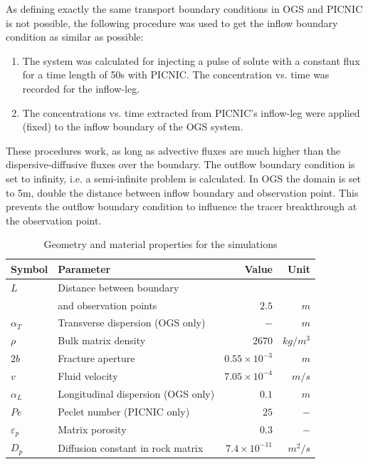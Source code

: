 As defining exactly the same transport boundary conditions in OGS
and PICNIC is not possible, the following procedure was used to get
the inflow boundary condition as similar as possible:

\begin{enumerate}
	\item 
The system was calculated for injecting a pulse of solute with a
constant flux for a time length of 50s with PICNIC. The
concentration vs. time was recorded for the inflow-leg.
  \item
The concentrations vs. time extracted from PICNIC's inflow-leg
were applied (fixed) to the inflow boundary of the OGS system.
\end{enumerate}

These procedures work, as long as advective fluxes are much higher
than the dispersive-diffusive fluxes over the boundary.
%
The outflow boundary condition is set to infinity, i.e. a
semi-infinite problem is calculated. In OGS the domain is set to
5m, double the distance between inflow boundary and observation
point. This prevents the outflow boundary condition to influence the
tracer breakthrough at the observation point.

\begin{table}[htb]%
\begin{center}
\begin{tabular}{llrr}
\toprule
Symbol & Parameter & Value & Unit \\
\midrule
 $L$ & Distance between boundary & & \\
     & and observation points & $2.5$ & $m$ \\
 $\alpha_{T}$ & Transverse dispersion (OGS only) & $-$ & $m$ \\
 $\rho$ & Bulk matrix density & $2670$ & $kg/m^{3}$ \\
 $2b$ & Fracture aperture & $0.55\times10^{-3}$ & $m$ \\
 $v$ & Fluid velocity & $7.05\times10^{-4}$ & $m/s$ \\
 $\alpha_{L}$ & Longitudinal dispersion (OGS only) & $0.1$ & $m$ \\
 $Pe$ & Peclet number (PICNIC only) & $25$ & $-$ \\
 $\varepsilon_{p}$ & Matrix porosity & $0.3$ & $-$ \\
 $D_{p}$ & Diffusion constant in rock matrix & $7.4\times10^{-11}$ & $m^{2}/s$ \\
\bottomrule
\end{tabular}
\caption{Geometry and material properties for the simulations} %
\label{tab:c_matdiff_setting}
\end{center}
\end{table}

